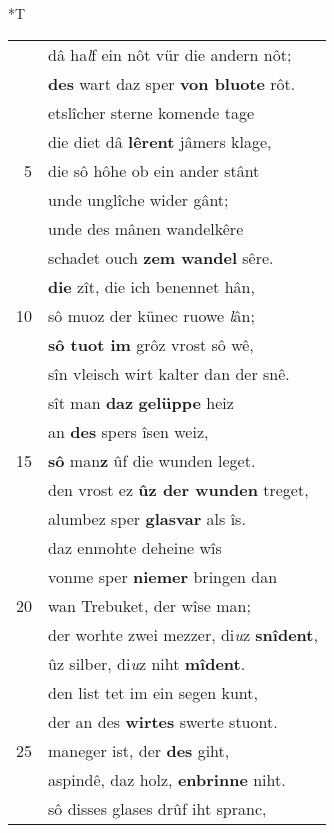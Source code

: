 \documentclass[8pt,a4paper,notitlepage]{article}
\begin{document}
\begin{table}[ht]
\begin{minipage}[t]{0.5\linewidth}
\end{minipage}
\hspace{0.5cm}
\begin{minipage}[t]{0.5\linewidth}
\small
\begin{center}*T
\end{center}
\begin{tabular}{rl}
 & dâ ha\textit{l}f ein nôt vür die andern nôt;\\ 
 & \textbf{des} wart daz sper \textbf{von bluote} rôt.\\ 
 & etslîcher sterne komende tage\\ 
 & die diet dâ \textbf{lêrent} jâmers klage,\\ 
5 & die sô hôhe ob ein ander stânt\\ 
 & unde unglîche wider gânt;\\ 
 & unde des mânen wandelkêre\\ 
 & schadet ouch \textbf{zem wandel} sêre.\\ 
 & \textbf{die} zît, die ich benennet hân,\\ 
10 & sô muoz der künec ruowe \textit{l}ân;\\ 
 & \textbf{sô tuot im} grôz vrost sô wê,\\ 
 & sîn vleisch wirt kalter dan der snê.\\ 
 & sît man \textbf{daz} \textbf{gelüppe} heiz\\ 
 & an \textbf{des} spers îsen weiz,\\ 
15 & \textbf{sô} man\textbf{z} ûf die wunden leget.\\ 
 & den vrost ez \textbf{ûz der wunden} treget,\\ 
 & alumbez sper \textbf{glasvar} als îs.\\ 
 & daz enmohte deheine wîs\\ 
 & vonme sper \textbf{niemer} bringen dan\\ 
20 & wan Trebuket, der wîse man;\\ 
 & der worhte zwei mezzer, di\textit{u}z \textbf{snîdent},\\ 
 & ûz silber, di\textit{u}z niht \textbf{mîdent}.\\ 
 & den list tet im ein segen kunt,\\ 
 & der an des \textbf{wirtes} swerte stuont.\\ 
25 & maneger ist, der \textbf{des} giht,\\ 
 & aspindê, daz holz, \textbf{enbrinne} niht.\\ 
 & sô disses glases drûf iht spranc,\\ 

\end{tabular}
\end{minipage}
\end{table}
\end{document}
